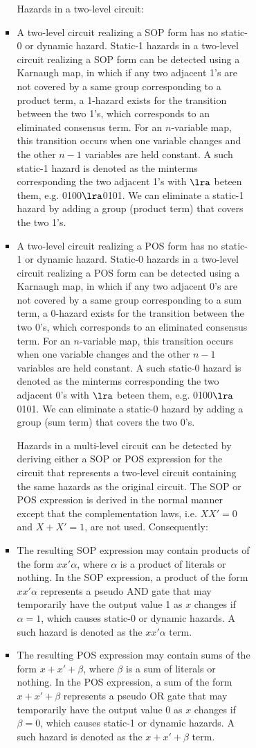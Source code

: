 \documentclass[a4paper,12pt]{article}
\begin{document}
\begin{itemize}
\begin{itemize}
\begin{itemize}
\begin{itemize}
\begin{itemize}
\begin{itemize}
\begin{itemize}
Hazards in a two-level circuit:
\bit
\item A two-level circuit realizing a SOP form has no static-0 or dynamic hazard. Static-1 hazards in a two-level circuit realizing a SOP form can be detected using a Karnaugh map, in which if any two adjacent 1's are not covered by a same group corresponding to a product term, a 1-hazard exists for the transition between the two 1's, which corresponds to an eliminated consensus term. For an $n$-variable map, this transition occurs when one variable changes and the other $n-1$ variables are held constant. A such static-1 hazard is denoted as the minterms corresponding the two adjacent 1's with $\lra$ beteen them, e.g. 0100$\lra$0101. We can eliminate a static-1 hazard by adding a group (product term) that covers the two 1's.
\item A two-level circuit realizing a POS form has no static-1 or dynamic hazard. Static-0 hazards in a two-level circuit realizing a POS form can be detected using a Karnaugh map, in which if any two adjacent 0's are not covered by a same group corresponding to a sum term, a 0-hazard exists for the transition between the two 0's, which corresponds to an eliminated consensus term. For an $n$-variable map, this transition occurs when one variable changes and the other $n-1$ variables are held constant. A such static-0 hazard is denoted as the minterms corresponding the two adjacent 0's with $\lra$ beteen them, e.g. 0100$\lra$0101. We can eliminate a static-0 hazard by adding a group (sum term) that covers the two 0's.
\eit

Hazards in a multi-level circuit can be detected by deriving either a SOP or POS expression for the circuit that represents a two-level circuit containing the same hazards as the original circuit. The SOP or POS expression is derived in the normal manner except that the complementation laws, i.e. $XX'=0$ and $X+X'=1$, are not used. Consequently:
\bit
\item The resulting SOP expression may contain products of the form $xx'\alpha$, where $\alpha$ is a product of literals or nothing. In the SOP expression, a product of the form $xx'\alpha$ represents a pseudo AND gate that may temporarily have the output value 1 as $x$ changes if $\alpha=1$, which causes static-0 or dynamic hazards. A such hazard is denoted as the $xx'\alpha$ term.
\item The resulting POS expression may contain sums of the form $x+x'+\beta$, where $\beta$ is a sum of literals or nothing. In the POS expression, a sum of the form $x+x'+\beta$ represents a pseudo OR gate that may temporarily have the output value 0 as $x$ changes if $\beta=0$, which causes static-1 or dynamic hazards. A such hazard is denoted as the $x+x'+\beta$ term.
\eit


\end{itemize}
\end{itemize}
\end{itemize}
\end{itemize}
\end{itemize}
\end{itemize}
\end{itemize}
\end{document}
